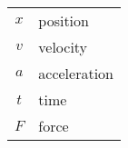 \begin{tabular}{cp{}}
  $x$ & position \\
  $v$ & velocity \\
  $a$ & acceleration \\
  $t$ & time \\
  $F$ & force
\end{tabular}\\
